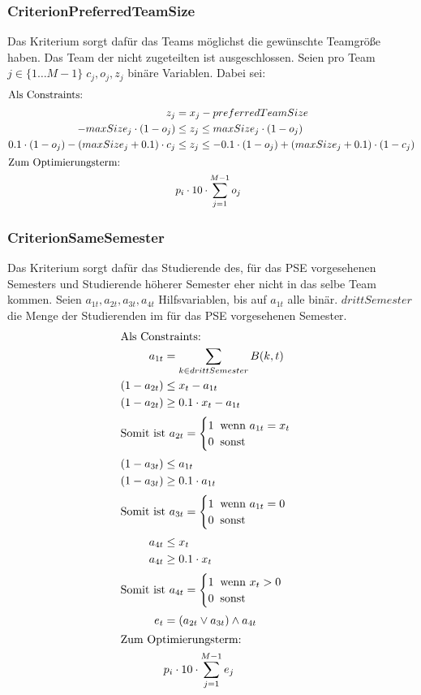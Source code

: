 \documentclass[parskip=full]{scrartcl}
\begin{document}
\subsubsection{CriterionPreferredTeamSize}
Das Kriterium sorgt dafür das Teams möglichst die gewünschte Teamgröße haben.
Das Team der nicht zugeteilten ist ausgeschlossen. Seien pro Team $j \in \{1\ldots M-1 \} \; c_j,o_j,z_j$ binäre Variablen.
Dabei sei: 
\begin{align*}
\intertext{Als Constraints: }
z_j &=x_j - preferredTeamSize\\
-maxSize_j \cdot (1-o_j) &\le z_j \le maxSize_j \cdot (1-o_j)\\
0.1\cdot(1-o_j) - (maxSize_j + 0.1)\cdot c_j &\le z_j \le -0.1\cdot
(1-o_j)+(maxSize_j +0.1)\cdot(1-c_j)\\
\intertext{Zum Optimierungsterm:} 
 &p_i \cdot 10 \cdot \sum_{j = 1}^{M-1}
o_j
\end{align*}
\subsubsection{CriterionSameSemester}
Das Kriterium sorgt dafür das Studierende des, für das PSE vorgesehenen
Semesters und Studierende höherer Semester eher nicht in das selbe Team kommen. 
Seien $a_{1t},a_{2t},a_{3t},a_{4t}$ Hilfsvariablen, bis auf $a_{1t}$ alle binär.
$drittSemester$ die Menge der Studierenden im für das PSE vorgesehenen Semester.
\begin{align*}
\intertext{Als Constraints:} 
a_{1t} &= \sum_{k \in drittSemester} B(k,t) \\
(1 - a_{2t}) &\le x_t - a_{1t} \\ (1 - a_{2t}) &\ge 0.1 \cdot x_t - a_{1t} \\
\intertext{$\text{Somit ist } a_{2t} = \begin{cases}
    1 \;\; \text{wenn $a_{1t} = x_t$} \\
    0 \;\; \text{sonst} 
\end{cases}$}
(1-a_{3t}) &\le a_{1t} \\
(1-a_{3t}) &\ge 0.1 \cdot a_{1t}\\
\intertext{$\text{Somit ist } a_{3t} = \begin{cases}
    1 \;\; \text{wenn $a_{1t} = 0$} \\
    0 \;\; \text{sonst} 
\end{cases}$}
a_{4t} &\le x_t \\
a_{4t} &\ge 0.1 \cdot x_t \\
\intertext{$\text{Somit ist } a_{4t} = \begin{cases}
    1 \;\; \text{wenn $x_t > 0$} \\
    0 \;\; \text{sonst} 
\end{cases}$}
e_t &= (a_{2t} \vee a_{3t}) \wedge a_{4t}\\ \intertext{Zum Optimierungsterm:} 
&p_i \cdot 10 \cdot \sum_{j=1 }^{M-1} e_j
\end{align*}
\end{document}
